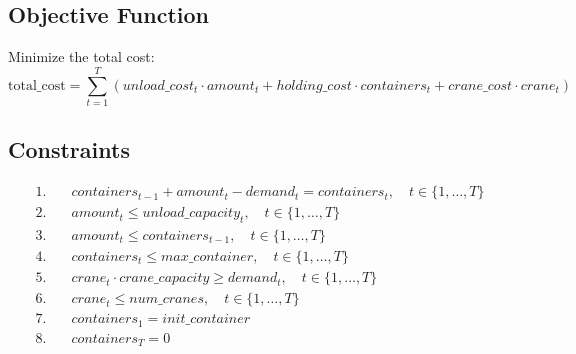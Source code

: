 \documentclass{article}
\begin{document}
\subsection*{Objective Function}
Minimize the total cost:
\[
\text{total\_cost} = \sum_{t=1}^{T} \left( unload\_cost_{t} \cdot amount_{t} + holding\_cost \cdot containers_{t} + crane\_cost \cdot crane_{t} \right)
\]

\subsection*{Constraints}
\begin{align*}
1. & \quad containers_{t-1} + amount_{t} - demand_{t} = containers_{t}, \quad t \in \{1, \ldots, T\} \\
2. & \quad amount_{t} \leq unload\_capacity_{t}, \quad t \in \{1, \ldots, T\} \\
3. & \quad amount_{t} \leq containers_{t-1}, \quad t \in \{1, \ldots, T\} \\
4. & \quad containers_{t} \leq max\_container, \quad t \in \{1, \ldots, T\} \\
5. & \quad crane_{t} \cdot crane\_capacity \geq demand_{t}, \quad t \in \{1, \ldots, T\} \\
6. & \quad crane_{t} \leq num\_cranes, \quad t \in \{1, \ldots, T\} \\
7. & \quad containers_{1} = init\_container \\
8. & \quad containers_{T} = 0
\end{align*}
\end{document}
